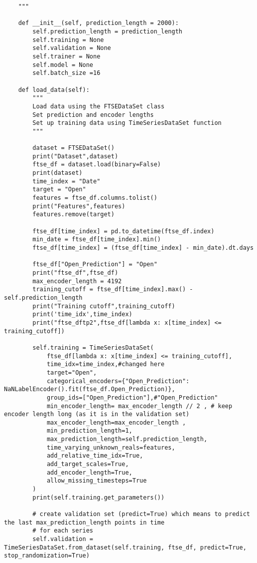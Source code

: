 \documentclass{article}
\begin{document}
\begin{lstlisting}
    """

    def __init__(self, prediction_length = 2000):
        self.prediction_length = prediction_length
        self.training = None
        self.validation = None
        self.trainer = None
        self.model = None
        self.batch_size =16

    def load_data(self):
        """
        Load data using the FTSEDataSet class
        Set prediction and encoder lengths
        Set up training data using TimeSeriesDataSet function
        """

        dataset = FTSEDataSet()
        print("Dataset",dataset)
        ftse_df = dataset.load(binary=False)
        print(dataset)
        time_index = "Date"
        target = "Open"
        features = ftse_df.columns.tolist()
        print("Features",features)
        features.remove(target)

        ftse_df[time_index] = pd.to_datetime(ftse_df.index)
        min_date = ftse_df[time_index].min()
        ftse_df[time_index] = (ftse_df[time_index] - min_date).dt.days

        ftse_df["Open_Prediction"] = "Open"
        print("ftse_df",ftse_df)
        max_encoder_length = 4192
        training_cutoff = ftse_df[time_index].max() - self.prediction_length
        print("Training cutoff",training_cutoff)
        print('time_idx',time_index)
        print("ftse_dftp2",ftse_df[lambda x: x[time_index] <= training_cutoff])

        self.training = TimeSeriesDataSet(
            ftse_df[lambda x: x[time_index] <= training_cutoff],
            time_idx=time_index,#changed here
            target="Open",
            categorical_encoders={"Open_Prediction": NaNLabelEncoder().fit(ftse_df.Open_Prediction)},
            group_ids=["Open_Prediction"],#"Open_Prediction"
            min_encoder_length= max_encoder_length // 2 , # keep encoder length long (as it is in the validation set)
            max_encoder_length=max_encoder_length ,
            min_prediction_length=1,
            max_prediction_length=self.prediction_length,
            time_varying_unknown_reals=features,
            add_relative_time_idx=True,
            add_target_scales=True,
            add_encoder_length=True,
            allow_missing_timesteps=True
        )
        print(self.training.get_parameters())

        # create validation set (predict=True) which means to predict the last max_prediction_length points in time
        # for each series
        self.validation = TimeSeriesDataSet.from_dataset(self.training, ftse_df, predict=True, stop_randomization=True)


\end{lstlisting}
\end{document}
